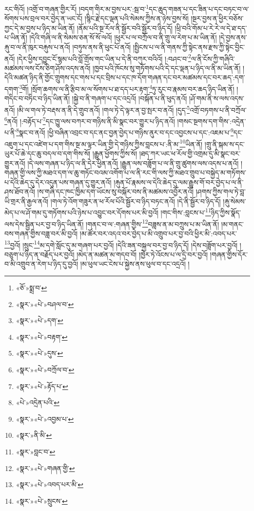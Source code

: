རང་གིའོ། །འགྲོ་བ་གཞན་གྱིར་རོ། །བདག་གིར་མ་བྱས་པར་:སྦ་བ་\footnote{«ཅོ་»སྨྲ་བ་}དང་ཆུད་གཟན་པ་དང་ཟིན་པ་དང་བཏང་བ་ལ་སོགས་པས་བྲལ་བར་བྱེད་ན་ཡང་ངོ། །སྙིང་རྗེ་དང་ལྡན་པའི་སེམས་ཀྱིས་ན་ཉེས་བྱས་སོ། །སྔར་བྱས་ན་ཕྱིར་བཅོས་ཀྱང་དེ་མ་བྱས་པ་ཉིད་མ་ཡིན་ནོ། །ནོམ་པའི་སྔ་རོལ་ནི་སྦྱོར་བའི་སྦྱོར་བ་ཉིད་དོ། །ཕྲི་བའི་གོམ་པ་རེ་རེ་ལ་དེ་ཐ་དད་པ་ཡིན་ནོ། །དེའི་གཞི་ལ་ནི་སེམས་ཅན་སོ་སོ་ལའོ། །ཕུར་པ་ལ་བཀྲོལ་བ་ནི་གྲུ་ལ་རེག་པ་མ་ཡིན་ནོ། །དེ་བྱས་ནས་རྐུ་བ་ལ་ནི་ཁུར་བརྐུས་པ་ནའོ། །བཏུས་ནས་ནི་ཕུང་པོ་ནའོ། །སྤྱིངས་པ་ལ་ནི་གནས་ཀྱི་སྟེང་ནས་རྫས་ཀྱི་སྟེང་བྱིང་ནའོ། །དེར་ཕྱིས་དབྱུང་ངོ་སྙམ་པའི་བློ་གྲོས་གང་ཡིན་པ་དེ་ནི་བཀུར་བའིའོ། །:བཤང་བ་\footnote{«སྣར་»«པེ་»བཤལ་བ་}ལ་ནི་ངོས་ཀྱི་གཞིའི་མཚམས་ལས་ངོས་ཅིག་ཤོས་འདས་ནའོ། །ཁྱབ་པའི་ཁོངས་སུ་གཏོགས་པའི་དེ་དང་ལྡན་པ་ཉིད་ལ་ནི་མ་ཡིན་ནོ། །དེའི་མཚན་ཉིད་ནི་གྱོང་གྲུགས་དང་གས་པ་དང་བྲིས་པ་དང་ཁ་དོག་གཞན་དང་བར་མཚམས་དང་བར་ཆད་:དག་དགག་\footnote{«སྣར་»«པེ་»དག་}གོ། །སྲོག་ཆགས་ལ་ནི་རྩིབ་མ་ལ་སོགས་པ་ཐ་དད་པར་རྟག་\footnote{«སྣར་»«པེ་»བརྟག་}ཏུ་རུང་བ་རྣམས་བར་ཆད་ཉིད་ཡིན་ནོ། །གདིང་བ་བཏིང་བ་ཉིད་ཡིན་ནོ། །སྐྱེ་བ་ནི་གཞག་པ་དང་འདྲའོ། །བསྐོན་པ་ནི་ཕུད་ནའོ། །ཤོ་གམ་ནི་ས་ལས་འདས་ནའོ། །མི་ལ་གལ་ཏེ་བརྡས་ན་ནི་དེ་གྲུབ་ནའོ། །གལ་ཏེ་དེ་ལྟར་ན་བྱ་སྤར་བ་ནའོ། །དུད་\footnote{«སྣར་»«པེ་»དུས་}འགྲོ་བཏགས་པ་ནི་བཀྲོལ་\footnote{«སྣར་»«པེ་»བཀྲོལ་བ་}ནའོ། །:བརྟོད་པ་\footnote{«སྣར་»«པེ་»རྟོད་པ་}དང་ཁྱུ་ལས་བཀར་བ་གཉིས་ནི་མི་སྣང་བར་གྱུར་པ་ཉིད་ནའོ། །གསང་སྔགས་དག་གིས་:འདྲེན་པ་ནི་\footnote{«པེ་»འདྲེན་པའི་}སྣང་བ་ནའོ། །ཕྱི་བཞིན་འབྲང་བ་དང་ནང་བྱན་བྱེད་པ་གཉིས་ནུར་བ་དང་འབྱངས་པ་དང་:འཇམ་པ་\footnote{«སྣར་»«པེ་»འབྱམ་པ་}དང་འཇུག་པ་དང་འཛེག་པ་དག་གིས་སྔ་མ་ལྟར་ཡིན་གྱི་དེ་གཉིས་ཀྱིས་བླངས་པ་:ནི་མ་\footnote{«སྣར་»ནི་མི་}ཡིན་ནོ། །གྲུ་ནི་སྐམ་ས་དང་ཡུར་པོ་ཆེ་དང་ཆུ་བདལ་བ་དག་གིས་སོ། །རྒྱུན་ཕྱོགས་ཀྱིས་སོ། །ཐད་ཀར་ཡང་ཕ་རོལ་གྱི་འགྲམ་དུ་མི་སྣང་བར་གྱུར་ནའོ། །དེ་ལས་གཞན་པ་ཉིད་ལ་ནི་དེར་ཕྱིན་ནའོ། །རྒྱུན་ལས་བཟློག་པ་ལ་ནི་གྲུ་ཚུགས་ལས་འདས་པ་ནའོ། །གཞན་གྱི་ལས་ཀྱི་མཐའ་དག་ལ་ཆུ་གཏོང་བའམ་འགོག་པ་ལ་ནི་རང་གི་ལས་ཀྱི་མཐའ་གྲུབ་པ་བསྐྱེད་མ་གཏོགས་པ་དེའི་ཆེད་དུ་དེར་འདུན་པས་གཞན་དུ་གྱུར་ནའོ། །རྐུན་པོ་རྣམས་ལ་དེའི་ཆེད་དུ་ལམ་རྒྱུས་གོ་བར་བྱེད་པ་ལ་ནི་ཤས་ཐོབ་ནའོ། །ས་གཞི་དང་ཁང་ཁྱིམ་དག་ཡོངས་སུ་བསྐོར་བས་ནི་མཚམས་འབྱོར་ནའོ། །ཤགས་ཀྱིས་གལ་ཏེ་བླ་ཡི་གྲར་ནི་རྒྱལ་ནའོ། །གལ་ཏེ་འོག་གཟུར་ན་ཕ་རོལ་པོའི་སྦྱོར་བ་ཉིད་བཏང་ནའོ། །དེ་ནི་སྦྱོར་བ་ཉིད་དོ། །རྐུ་སེམས་མེད་པ་ལ་ཤོ་གམ་དུ་གཏོགས་པའི་ཉེས་པ་འབྱུང་བར་དོགས་པར་མི་བྱའོ། །གང་གིས་:བླངས་པ་\footnote{«སྣར་»བླང་བ་}ཉིད་ཀྱིས་སྣོད་ལས་དེས་སྦྱིན་པར་བྱ་བ་ཉིད་ཡིན་ནོ། །གནང་བ་ལ་:གཞན་གྱིས་\footnote{«སྣར་»«པེ་»གཞན་གྱི་}བཟླས་ན་མ་བཀྲུས་པ་མ་ཡིན་ནོ། །མ་གནང་བས་གཞན་གྱིས་བཟླ་བར་མི་བྱའོ། །མ་ཚོར་བར་འདའ་བར་བྱེད་པ་མི་འགྲུབ་པར་བྱ་བའི་ཕྱིར་མི་:འབད་པར་\footnote{«སྣར་»«པེ་»འབད་པར་མི་}བྱའོ། །སྲུང་\footnote{«སྣར་»«པེ་»སྲུངས་}མ་དགེ་སློང་དུ་མ་གཞག་པར་བྱའོ། །དེའི་ཟན་བསྐྱལ་བར་བྱ་བ་ཉིད་དོ། །དེས་བཟློག་པར་བྱའོ། །བཅུག་པ་ཉིད་ན་བརྗོད་པར་བྱའོ། །མེད་ན་མཚན་མ་གདབ་བོ། །ཁྱེར་ཏེ་འོངས་པ་ལ་དྲི་བར་བྱའོ། །གཞན་གྱིས་དོར་བ་མི་འགྲུབ་ན་རེག་པ་ཉིད་དུ་བྱའོ། །མ་ཕུལ་ཡང་ངེས་པ་སྐྱེས་ནས་ཕུལ་བ་དང་འདྲའོ། །
